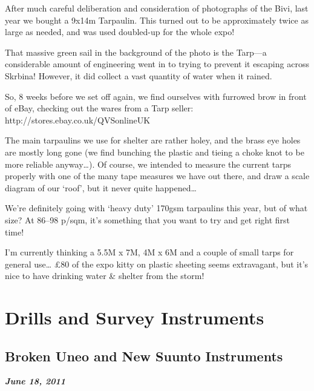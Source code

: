 After much careful deliberation and consideration of photographs of
the Bivi, last year we bought a 9x14m Tarpaulin.
This turned out to be approximately twice as large as needed, and was
used doubled-up for the whole expo!


That massive green sail in the background of the photo is the Tarp—a
considerable amount of engineering went in to trying to prevent it
escaping across Skrbina! However, it did collect a vast quantity of
water when it rained.

So, 8 weeks before we set off again, we find ourselves with furrowed
brow in front of eBay, checking out the wares from a Tarp seller:
http://stores.ebay.co.uk/QVSonlineUK

The main tarpaulins we use for shelter are rather holey, and the brass
eye holes are mostly long gone (we find bunching the plastic and
tieing a choke knot to be more reliable anyway\ldots{}). Of course, we
intended to measure the current tarps properly with one of the many
tape measures we have out there, and draw a scale diagram of our
‘roof’, but it never quite happened\ldots{}

We’re definitely going with ‘heavy duty’ 170gsm tarpaulins this year,
but of what size? At 86–98 p/sqm, it’s something that you want to try
and get right first time! 

I’m currently thinking a 5.5M x 7M, 4M x 6M and a couple of small
tarps for general use\ldots{} £80 of the expo kitty on plastic sheeting
seems extravagant, but it’s nice to have drinking water \& shelter from
the storm!




\section{Drills and Survey Instruments}


\subsection{Broken Uneo and New Suunto Instruments}
\textbf{\textit{June 18, 2011}}

